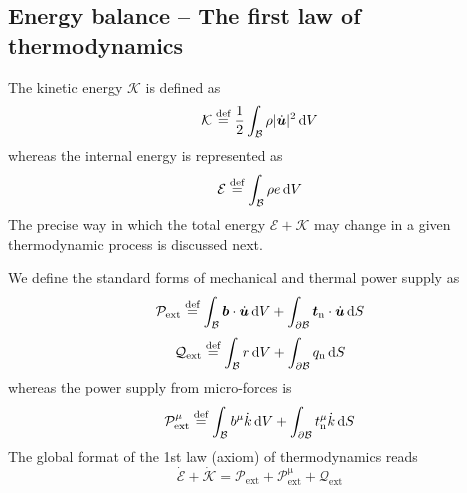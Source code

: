 \subsection{Energy balance -- The first law of thermo\-dynamics}

The kinetic energy ${\mathcal K}$ is defined as
\begin{equation}
  {\mathcal K} \stackrel{\text{def}}{=}
  \frac{1}{2} \int_{\mathcal B} \rho | \dot{\bm {u}} | ^2 \,{\mathrm{d}}V
\label{eq:vol_I_ch02_eq14}
\end{equation}
whereas the internal energy is represented as
\begin{equation}
   {\mathcal{E}} \stackrel{\text{def}}{=}
  \int_{\mathcal B}{\rho}e\,{\mathrm{d}}V
\label{eq:vol_I_ch02_eq15}
\end{equation}
The precise way in which the total energy ${\mathcal{E}}+{\mathcal K}$ may
change in a given thermodynamic process is discussed next.

We define the standard forms of mechanical and thermal power supply as
\begin{equation}
  {\mathcal{P}}_{\mathrm{ext}} \stackrel{\text{def}}{=}
  \int_{\mathcal B} {\bm b}\cdot{\dot{\bm u}}\,{\mathrm{d}}V +
  \int_{\partial \mathcal{B}} \bm{t}_{\mathrm{n}}\cdot{\dot{\bm u}}\,{\mathrm{d}}S
\label{eq:vol_I_ch02_eq16}
\end{equation}
\begin{equation}
  {\mathcal{Q}}_{\mathrm{ext}} \stackrel{\text{def}}{=}
  \int_{\mathcal B} r\,{\mathrm{d}}V + \int_{\partial \mathcal{B}}q_{\mathrm{n}}\,{\mathrm{d}}S
\label{eq:vol_I_ch02_eq17}
\end{equation}
whereas the power supply from micro-forces is
\begin{equation}
  {\mathcal{P}}_{\mathrm{ext}}^{\mathrm{\mu}} \stackrel{\text{def}}{=}
  \int_{\mathcal B} b^{\mathrm{\mu}}\dot{k}\,{\mathrm{d}}V +
  \int_{\partial \mathcal{B}} t_{\mathrm{n}}^{\mathrm{\mu}}\dot{k}\,{\mathrm{d}}S
\label{eq:vol_I_ch02_eq16a}
\end{equation}
The global format of the 1st law (axiom) of thermodynamics reads
\begin{equation}
  \mathcal{\dot{E}}+\mathcal{\dot{K}} = {\mathcal{P}}_{\mathrm{ext}} + {\mathcal{P}}_{\mathrm{ext}}^{\mathrm{\mu}} + {\mathcal{Q}}_{\mathrm{ext}}
\label{eq:vol_I_ch02_eq18}
\end{equation}


